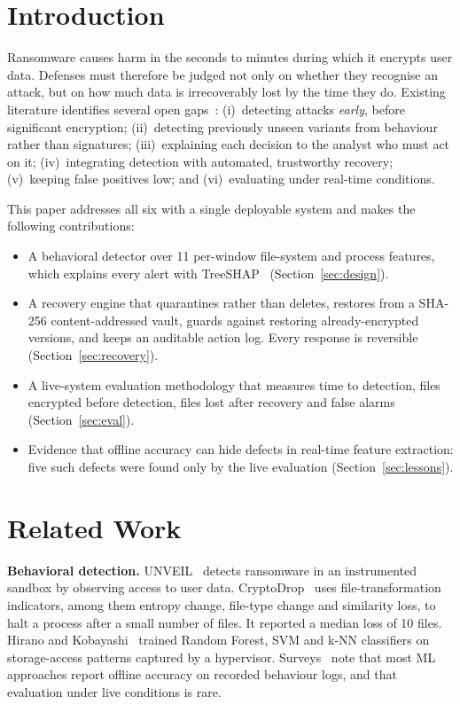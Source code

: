 \documentclass[conference]{IEEEtran}
\begin{document}
\section{Introduction}
Ransomware causes harm in the seconds to minutes during which it encrypts user data. Defenses must therefore be judged not only on whether they recognise an attack, but on how much data is irrecoverably lost by the time they do. Existing literature identifies several open gaps~\cite{urooj2022survey,vehabovic2022strategies}:
(i)~detecting attacks \emph{early}, before significant encryption;
(ii)~detecting previously unseen variants from behaviour rather than signatures;
(iii)~explaining each decision to the analyst who must act on it;
(iv)~integrating detection with automated, trustworthy recovery;
(v)~keeping false positives low; and
(vi)~evaluating under real-time conditions.

This paper addresses all six with a single deployable system and makes the following contributions:
\begin{itemize}
\item A behavioral detector over 11 per-window file-system and process features, which explains every alert with TreeSHAP~\cite{lundberg2020treeshap} (Section~\ref{sec:design}).
\item A recovery engine that quarantines rather than deletes, restores from a SHA-256 content-addressed vault, guards against restoring already-encrypted versions, and keeps an auditable action log. Every response is reversible (Section~\ref{sec:recovery}).
\item A live-system evaluation methodology that measures time to detection, files encrypted before detection, files lost after recovery and false alarms (Section~\ref{sec:eval}).
\item Evidence that offline accuracy can hide defects in real-time feature extraction: five such defects were found only by the live evaluation (Section~\ref{sec:lessons}).
\end{itemize}

\section{Related Work}
\textbf{Behavioral detection.} UNVEIL~\cite{kharraz2016unveil} detects ransomware in an instrumented sandbox by observing access to user data. CryptoDrop~\cite{scaife2016cryptolock} uses file-transformation indicators, among them entropy change, file-type change and similarity loss, to halt a process after a small number of files. It reported a median loss of 10 files. Hirano and Kobayashi~\cite{hirano2019storage} trained Random Forest, SVM and k-NN classifiers on storage-access patterns captured by a hypervisor. Surveys~\cite{urooj2022survey,vehabovic2022strategies} note that most ML approaches report offline accuracy on recorded behaviour logs, and that evaluation under live conditions is rare.
\end{document}
